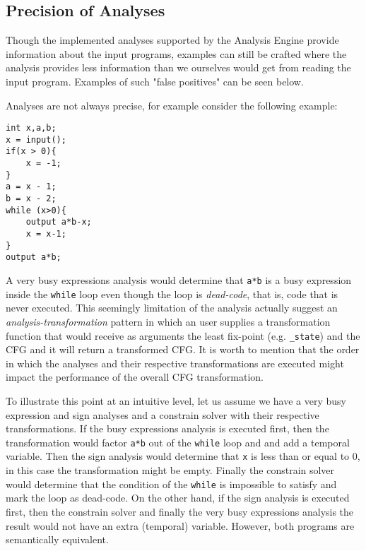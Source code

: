 \subsection{Precision of Analyses}

Though the implemented analyses supported by the Analysis Engine provide information about the input programs, examples can still be crafted where the analysis provides less information than we ourselves would get from reading the input program. Examples of such "false positives" can be seen below. 

\newpar Analyses are not always precise, for example consider the following example:

\begin{verbatim}
int x,a,b;
x = input();
if(x > 0){
	x = -1;
}
a = x - 1;
b = x - 2;
while (x>0){
	output a*b-x;
	x = x-1;
}
output a*b;
\end{verbatim}

\newpar A very busy expressions analysis would determine that \texttt{a*b} is a busy expression inside the \texttt{while} loop even though the loop is \emph{dead-code}, that is, code that is never executed. This seemingly limitation of the analysis actually suggest an \emph{analysis-transformation} pattern in which an user supplies a transformation function that would receive as arguments the least fix-point (e.g. \texttt{\_state}) and the CFG and it will return a transformed CFG. It is worth to mention that the order in which the analyses and their respective transformations are executed might impact the performance of the overall CFG transformation. 

\newpar To illustrate this point at an intuitive level, let us assume we have a very busy expression and sign analyses and a constrain solver with their respective transformations. If the busy expressions analysis is executed first, then the transformation would factor \texttt{a*b} out of the \texttt{while} loop and and add a temporal variable. Then the sign analysis would determine that \texttt{x} is less than or equal to $0$, in this case the transformation might be empty. Finally the constrain solver would determine that the condition of the \texttt{while} is impossible to satisfy and mark the loop as dead-code. On the other hand, if the sign analysis is executed first, then the constrain solver and finally the very busy expressions analysis the result would not have an extra (temporal) variable. However, both programs are semantically equivalent. 